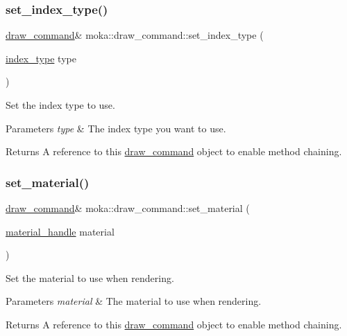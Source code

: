 \subsubsection{\texorpdfstring{set\_index\_type()}{set\_index\_type()}}
{\footnotesize\ttfamily \mbox{\hyperlink{classmoka_1_1draw__command}{draw\+\_\+command}}\& moka\+::draw\+\_\+command\+::set\+\_\+index\+\_\+type (\begin{DoxyParamCaption}\item[{\mbox{\hyperlink{namespacemoka_a32244b0de63481283738e2db11639e3f}{index\+\_\+type}}}]{type }\end{DoxyParamCaption})}



Set the index type to use. 


\begin{DoxyParams}{Parameters}
{\em type} & The index type you want to use. \\
\hline
\end{DoxyParams}
\begin{DoxyReturn}{Returns}
A reference to this \mbox{\hyperlink{classmoka_1_1draw__command}{draw\+\_\+command}} object to enable method chaining. 
\end{DoxyReturn}
\mbox{\label{classmoka_1_1draw__command_a593b24a1594565446b31d0cdbf157548}} 
\subsubsection{\texorpdfstring{set\_material()}{set\_material()}}
{\footnotesize\ttfamily \mbox{\hyperlink{classmoka_1_1draw__command}{draw\+\_\+command}}\& moka\+::draw\+\_\+command\+::set\+\_\+material (\begin{DoxyParamCaption}\item[{\mbox{\hyperlink{structmoka_1_1material__handle}{material\+\_\+handle}}}]{material }\end{DoxyParamCaption})}



Set the material to use when rendering. 


\begin{DoxyParams}{Parameters}
{\em material} & The material to use when rendering. \\
\hline
\end{DoxyParams}
\begin{DoxyReturn}{Returns}
A reference to this \mbox{\hyperlink{classmoka_1_1draw__command}{draw\+\_\+command}} object to enable method chaining. 
\end{DoxyReturn}
\mbox{\label{classmoka_1_1draw__command_ac2fe420afb39028cdff695fc61371aa3}} 
